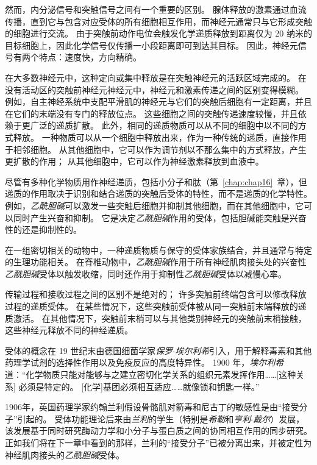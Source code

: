 然而，内分泌信号和突触信号之间有一个重要的区别。
腺体释放的激素通过血流传播，直到它与包含对应受体的所有细胞相互作用，而神经元通常只与它形成突触的细胞进行交流。
由于突触前动作电位会触发化学递质释放到距离仅为 20 纳米的目标细胞上，因此化学信号仅传播一小段距离即可到达其目标。 
因此，神经元信号有两个特点：速度快，方向精确。


在大多数神经元中，这种定向或集中释放是在突触神经元的活跃区域完成的。
在没有活动区的突触前神经元神经元中，神经元和激素传递之间的区别变得模糊。
例如，自主神经系统中支配平滑肌的神经元与它们的突触后细胞有一定距离，并且在它们的末端没有专门的释放位点。
这些细胞之间的突触传递速度较慢，并且依赖于更广泛的递质扩散。
此外，相同的递质物质可以从不同的细胞中以不同的方式释放。
一种物质可以从一个细胞中释放出来，作为一种传统的递质，直接作用于相邻细胞。
从其他细胞中，它可以作为调节剂以不那么集中的方式释放，产生更扩散的作用；
从其他细胞中，它可以作为神经激素释放到血液中。


尽管有多种化学物质用作神经递质，包括小分子和肽（第~\ref{chap:chap16}~章），但递质的作用取决于识别和结合递质的突触后受体的特性，而不是递质的化学特性。
例如，\textit{乙酰胆碱}可以激发一些突触后细胞并抑制其他细胞，而在其他细胞中，它可以同时产生兴奋和抑制。
它是决定\textit{乙酰胆碱}作用的受体，包括胆碱能突触是兴奋性的还是抑制性的。


在一组密切相关的动物中，一种递质物质与保守的受体家族结合，并且通常与特定的生理功能相关。
在脊椎动物中，\textit{乙酰胆碱}作用于所有神经肌肉接头处的兴奋性\textit{乙酰胆碱}受体以触发收缩，同时还作用于抑制性\textit{乙酰胆碱}受体以减慢心率。


传输过程和接收过程之间的区别不是绝对的；
许多突触前终端包含可以修改释放过程的递质受体。
在某些情况下，这些突触前受体被从同一突触前末端释放的递质激活。
在其他情况下，突触前末梢可以与其他类别神经元的突触前末梢接触，这些神经元释放不同的神经递质。


受体的概念在 19 世纪末由德国细菌学家\textit{保罗$\cdot$埃尔利希}引入，用于解释毒素和其他药理学试剂的选择性作用以及免疫反应的高度特异性。
1900 年，\textit{埃尔利希}道：“化学物质只能对能够与之建立密切化学关系的组织元素发挥作用……[这种关系] 必须是特定的。
[化学]基团必须相互适应……就像锁和钥匙一样。”


1906年，英国药理学家约翰兰利假设骨骼肌对箭毒和尼古丁的敏感性是由“接受分子”引起的。
受体功能理论后来由\textit{兰利}的学生（特别是\textit{希勒}和\textit{亨利$\cdot$戴尔}）发展，该发展基于同时研究酶动力学和小分子与蛋白质之间的协同相互作用的同步研究。
正如我们将在下一章中看到的那样，兰利的“接受分子”已被分离出来，并被定性为神经肌肉接头的\textit{乙酰胆碱}受体。


